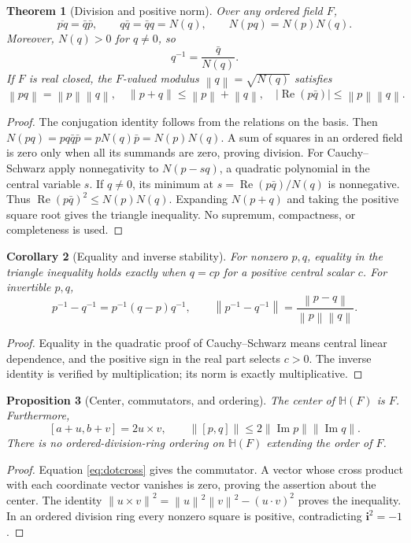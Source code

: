 \documentclass[11pt,letterpaper]{article}
\newtheorem{theorem}{Theorem}[section]
\newtheorem{proposition}[theorem]{Proposition}
\newtheorem{corollary}[theorem]{Corollary}
\theoremstyle{definition}
\newcommand{\HH}{\mathbb H}
\newcommand{\ii}{\mathbf i}
\newcommand{\abs}[1]{\left|#1\right|}
\newcommand{\norm}[1]{\left\lVert#1\right\rVert}
\DeclareMathOperator{\Rea}{Re}
\DeclareMathOperator{\Imag}{Im}
\begin{document}
\begin{theorem}[Division and positive norm]
\label{thm:division}
Over any ordered field $F$,
\[
 \overline{pq}=\bar q\bar p,\qquad
 q\bar q=\bar q q=N(q),\qquad N(pq)=N(p)N(q).
\]
Moreover, $N(q)>0$ for $q\ne0$, so
\[
 q^{-1}=\frac{\bar q}{N(q)}.
\]
If $F$ is real closed, the $F$-valued modulus $\norm q=\sqrt{N(q)}$ satisfies
\[
 \norm{pq}=\norm p\norm q,\quad
 \norm{p+q}\le\norm p+\norm q,\quad
 \abs{\Rea(p\bar q)}\le\norm p\norm q.
\]
\end{theorem}
\begin{proof}
The conjugation identity follows from the relations on the basis. Then
$N(pq)=pq\bar q\bar p=pN(q)\bar p=N(p)N(q)$. A sum of squares in an ordered
field is zero only when all its summands are zero, proving division.
For Cauchy--Schwarz apply nonnegativity to
$N(p-sq)$, a quadratic polynomial in the central variable $s$. If $q\ne0$, its
minimum at $s=\Rea(p\bar q)/N(q)$ is nonnegative. Thus
$\Rea(p\bar q)^2\le N(p)N(q)$. Expanding $N(p+q)$ and taking the positive square
root gives the triangle inequality. No supremum, compactness, or completeness
is used.
\end{proof}

\begin{corollary}[Equality and inverse stability]
For nonzero $p,q$, equality in the triangle inequality holds exactly when
$q=cp$ for a positive central scalar $c$. For invertible $p,q$,
\begin{equation}
 p^{-1}-q^{-1}=p^{-1}(q-p)q^{-1},\qquad
 \norm{p^{-1}-q^{-1}}=
 \frac{\norm{p-q}}{\norm p\norm q}.
 \label{eq:inverse-lipschitz}
\end{equation}
\end{corollary}
\begin{proof}
Equality in the quadratic proof of Cauchy--Schwarz means central linear
dependence, and the positive sign in the real part selects $c>0$. The inverse
identity is verified by multiplication; its norm is exactly multiplicative.
\end{proof}

\begin{proposition}[Center, commutators, and ordering]
\label{prop:center}
The center of $\HH(F)$ is $F$. Furthermore,
\[
 [a+u,b+v]=2u\times v,\qquad
 \norm{[p,q]}\le2\norm{\Imag p}\norm{\Imag q}.
\]
There is no ordered-division-ring ordering on $\HH(F)$ extending the order of
$F$.
\end{proposition}
\begin{proof}
Equation \eqref{eq:dotcross} gives the commutator. A vector whose cross product
with each coordinate vector vanishes is zero, proving the assertion about the
center. The identity
$\norm{u\times v}^2=\norm u^2\norm v^2-(u\cdot v)^2$ proves the inequality.
In an ordered division ring every nonzero square is positive, contradicting
$\ii^2=-1$.
\end{proof}
\end{document}
